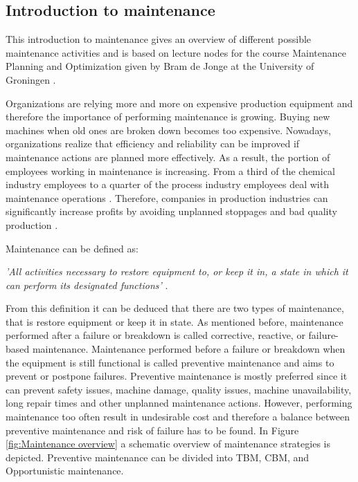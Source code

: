 \subsection{Introduction to maintenance} \label{Introduction to maintenance}
This introduction to maintenance gives an overview of different possible maintenance activities and is based on lecture nodes for the course Maintenance Planning and Optimization given by Bram de Jonge at the University of Groningen \parencite{DeJonge2017}. 

Organizations are relying more and more on expensive production equipment and therefore the importance of performing maintenance is growing. Buying new machines when old ones are broken down becomes too expensive. Nowadays, organizations realize that efficiency and reliability can be improved if maintenance actions are planned more effectively. As a result, the portion of employees working in maintenance is increasing. From a third of the chemical industry employees to a quarter of the process industry employees deal with maintenance operations \parencite{WAEYENBERGH2002}. Therefore, companies in production industries can significantly increase profits by avoiding unplanned stoppages and bad quality production \parencite{ALSYOUF200}. 

Maintenance can be defined as:
\begin{center}
\textit{'All activities necessary to restore equipment to, or keep it in, a state in which it can perform its designated functions'} \parencite{DeJonge2017}.
\end{center}
From this definition it can be deduced that there are two types of maintenance, that is restore equipment or keep it in state. As mentioned before, maintenance performed after a failure or breakdown is called corrective, reactive, or failure-based maintenance. Maintenance performed before a failure or breakdown when the equipment is still functional is called preventive maintenance and aims to prevent or postpone failures. Preventive maintenance is mostly preferred since it can prevent safety issues, machine damage, quality issues, machine unavailability, long repair times and other unplanned maintenance actions. However, performing maintenance too often result in undesirable cost and therefore a balance between preventive maintenance and risk of failure has to be found. In Figure \ref{fig:Maintenance overview} a schematic overview of maintenance strategies is depicted. Preventive maintenance can be divided into TBM, CBM, and Opportunistic maintenance. 

